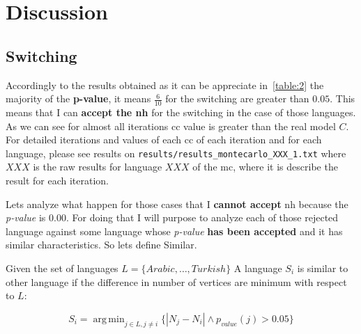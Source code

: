 \documentclass[12pt, a4paper]{article}
\DeclareMathOperator*{\argmin}{arg\,min}
\begin{document}
\section{Discussion}
\subsection{Switching}
Accordingly to the results obtained as it can be appreciate in~\ref{table:2} the majority of the \textbf{p-value}, it means $\frac{6}{10}$ for the 
\acrshort{switching} are greater than $0.05$. This means that I can \textbf{accept the \acrfull{nh}} for the \acrshort{switching} in the case of those languages. 
As we can see for almost all iterations \acrshort{cc} value is greater than the real model $C$.
For detailed iterations and values of each \acrshort{cc} of each iteration and for each language, please see results on \texttt{results/results_montecarlo_XXX_1.txt} 
where $XXX$ is the raw results for language $XXX$ of the \acrshort{mc}, where it is describe the result for each iteration.

Lets analyze what happen for those cases that I \textbf{cannot accept} \acrshort{nh} because the \textit{p-value} is $0.00$. For doing that I will purpose to analyze each of those 
rejected language against some language whose \textit{p-value} \textbf{has been accepted} and it has similar characteristics. So lets define Similar. 

Given the set of languages $L = \{Arabic, \dots, Turkish\}$ A language $S_i$ is similar to other language if the difference in number of vertices are minimum with respect to $L$:

\begin{equation}
    S_i = \argmin_{j \in L, j \neq i} \{ |N_j - N_i| \land p_{value}(j) > 0.05 \}
\end{equation}
\end{document}
